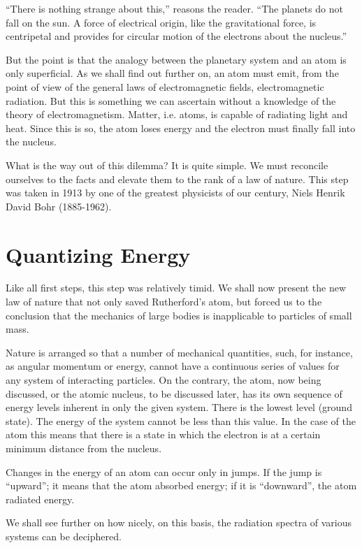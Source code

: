 ``There is nothing strange about this,'' reasons the reader. ``The planets do not fall on the sun. A force of electrical origin, like the gravitational force, is centripetal and provides for circular motion of the electrons about the nucleus.''

But the point is that the analogy between the planetary system and an atom is only superficial. As we shall find out further on, an atom must emit, from the point of view of the general laws of electromagnetic fields, electromagnetic radiation. But this is something we can ascertain without a knowledge of the theory of electromagnetism. Matter, i.e. atoms, is capable of radiating light and heat. Since this is so, the atom loses energy and the electron must finally fall into the nucleus.

What is the way out of this dilemma? It is quite simple. We must reconcile ourselves to the facts and elevate them to the rank of a law of nature. This step was taken in 1913 by one of the greatest physicists of our century, Niels Henrik David Bohr (1885-1962).

\section{Quantizing Energy}

Like all first steps, this step was relatively timid. We shall now present the new law of nature that not only saved Rutherford's atom, but forced us to the conclusion that the mechanics of large bodies is inapplicable to particles of small mass.

Nature is arranged so that a number of mechanical quantities, such, for instance, as angular momentum or energy, cannot have a continuous series of values for any system of interacting particles. On the contrary, the atom, now being discussed, or the atomic nucleus, to be discussed later, has its own sequence of energy levels inherent in only the given system. There is the lowest level (ground state). The energy of the system cannot be less than this value. In the case of the atom this means that there is a state in which the electron is at a certain minimum distance from the nucleus.

Changes in the energy of an atom can occur only in jumps. If the jump is ``upward''; it means that the atom absorbed energy; if it is ``downward'', the atom radiated energy.

We shall see further on how nicely, on this basis, the radiation spectra of various systems can be deciphered. 

